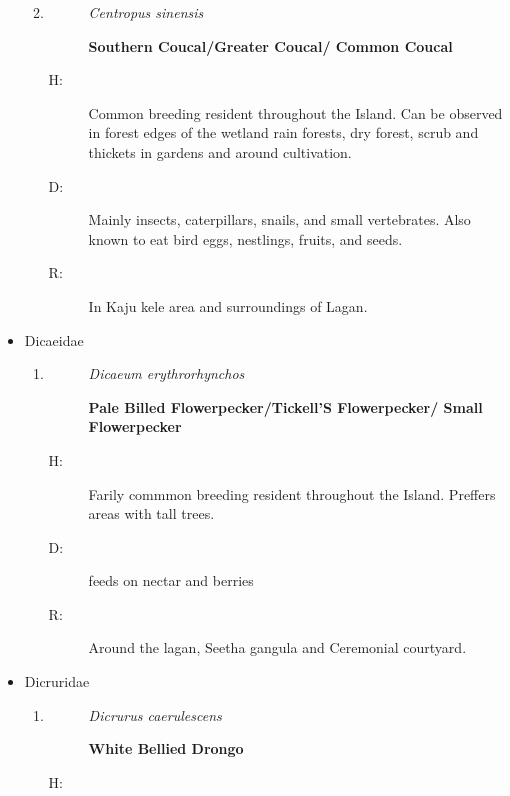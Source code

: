 \begin{itemize}
\begin{enumerate}
\begin{description}
\end{description}%
\item%
\begin{description}%
\item[]%
\textit{Centropus sinensis}%
\item[]%
\textbf{Southern Coucal/Greater Coucal/ Common Coucal}%
\end{description}%
\begin{description}%
\item[H: ]%
Common breeding resident throughout the Island. Can be observed in forest edges of the wetland rain forests, dry forest, scrub and thickets in gardens and around cultivation.%
\item[D: ]%
Mainly  insects, caterpillars, snails, and small vertebrates. Also known to eat bird eggs, nestlings, fruits, and seeds.%
\item[R: ]%
In Kaju kele area and surroundings of Lagan.%
\end{description}%
\end{enumerate}%
\item%
Dicaeidae%
\begin{enumerate}%
\item%
\begin{description}%
\item[]%
\textit{Dicaeum erythrorhynchos}%
\item[]%
\textbf{Pale Billed Flowerpecker/Tickell'S Flowerpecker/ Small Flowerpecker}%
\end{description}%
\begin{description}%
\item[H: ]%
Farily commmon breeding resident throughout the Island. Preffers areas with tall trees.%
\item[D: ]%
 feeds on nectar and berries%
\item[R: ]%
Around the lagan, Seetha gangula and Ceremonial courtyard.%
\end{description}%
\end{enumerate}%
\item%
Dicruridae%
\begin{enumerate}%
\item%
\begin{description}%
\item[]%
\textit{Dicrurus caerulescens}%
\item[]%
\textbf{White Bellied Drongo}%
\end{description}%
\begin{description}%
\item[H: ]%

\end{description}
\end{enumerate}
\end{itemize}
